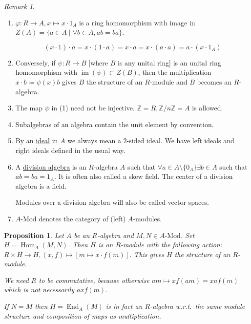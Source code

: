 \documentclass{article}
\theoremstyle{definition}
\theoremstyle{plain}
\newtheorem{proposition}[theorem]{Proposition}
\theoremstyle{remark}
\newtheorem{remark}[theorem]{Remark}
\begin{document}
    \begin{remark}
        \begin{enumerate}[label=\arabic*)]
            \item \(\varphi : R \to A, x \mapsto x \cdot 1_A\) is a ring homomorphism with image in \(Z(A) = \{ a\in A \mid \forall b\in A, ab = ba \}\). 
            
            \[
                (x \cdot 1) \cdot a = x \cdot (1 \cdot a) = x \cdot a = x \cdot (a \cdot a) = a \cdot (x \cdot 1_A)
            \]

            \item Conversely, if \(\psi : R \to B\) [where \(B\) is any unital ring] is an unital ring homomorphism with \(\operatorname{im} (\psi) \subset Z(B)\), then the multiplication \(x \cdot b \coloneqq \psi(x) b\) gives \(B\) the structure of an \(R\)-module and \(B\) becomes an \(R\)-algebra.
            \item The map \(\psi\) in (1) need not be injective. \(\mathbb{Z} = R, \mathbb{Z} / n\mathbb{Z} = A\) is allowed.
            \item Subalgebras of an algebra contain the unit element by convention.
            \item By an \underline{ideal} in \(A\) we always mean a \(2\)-sided ideal. We have left ideals and right ideals defined in the usual way.
            \item A \underline{division algebra} is an \(R\)-algebra \(A\) such that \(\forall a \in A \setminus \{ 0_A \} \exists b \in A\) such that \(ab = ba = 1_A\). It is often also called a skew field. The center of a division algebra is a field.
            
            Modules over a division algebra will also be called vector spaces.

            \item \(A\text{-Mod}\) denotes the category of (left) \(A\)-modules.
        \end{enumerate} 
    \end{remark}

    \begin{proposition}
        Let \(A\) be an \(R\)-algebra and \(M,N \in A\text{-Mod}\). Set \(H = \operatorname{Hom}_A(M,N)\). Then \(H\) is an \(R\)-module with the following action: \(R \times H \to  H, (x,f) \mapsto [m \mapsto x \cdot f(m)]\). This gives \(H\) the structure of an \(R\)-module. 
        
        We need \(R\) to be commutative, because otherwise \(am \mapsto x f(am) = xa f(m)\) which is not necessarily \(ax f(m)\). 
        
        If \(N = M\) then \(H = \operatorname{End}_A(M)\) is in fact an \(R\)-algebra w.r.t.\ the same module structure and composition of maps as multiplication.
    \end{proposition}
\end{document}
